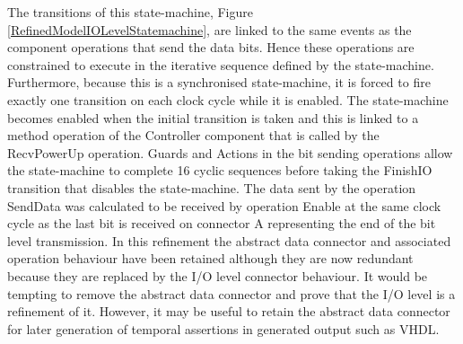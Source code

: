 The transitions of this state-machine, Figure \ref{RefinedModelIOLevelStatemachine}, are linked to the same events as the component operations that send the data bits. Hence these operations are constrained to execute in the iterative sequence defined by the state-machine. Furthermore, because this is a synchronised state-machine, it is forced to fire exactly one transition on each clock cycle while it is enabled. The state-machine becomes enabled when the initial transition is taken and this is linked to a method operation of the Controller component that is called by the RecvPowerUp operation. Guards and Actions in the bit sending operations allow the state-machine to complete 16 cyclic sequences before taking the FinishIO transition that disables the state-machine. The data sent by the operation SendData was calculated to be received by operation Enable at the same clock cycle as the last bit is received on connector A representing the end of the bit level transmission.
In this refinement the abstract data connector and associated operation behaviour have been retained although they are now redundant because they are replaced by the I/O level connector behaviour. It would be tempting to remove the abstract data connector and prove that the I/O level is a refinement of it. However, it may be useful to retain the abstract data connector for later generation of temporal assertions in generated output such as VHDL.

